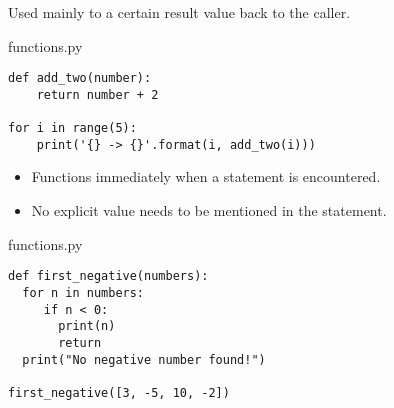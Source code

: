 \documentclass[aspectratio=1610,slidestop]{beamer}
\begin{document}
\begin{pframe}
 Used mainly to  a certain result value back to the caller.
 \medskip

 \begin{minipage}[t]{0.60\textwidth}
  \begin{pythonfile}{functions.py}
   \begin{verbatim}
def add_two(number):
    return number + 2

for i in range(5):
    print('{} -> {}'.format(i, add_two(i)))
   \end{verbatim}
  \end{pythonfile}
 \end{minipage}\qquad
 \pause
 \begin{minipage}[t]{0.35\textwidth}
 \vspace{-3.05cm}
 \begin{terminal}
 \end{terminal}
 \end{minipage}
\end{pframe}


\begin{pframe}
 \begin{itemize}
  \item Functions immediately  when a  statement is encountered.
  \item No explicit value needs to be mentioned in the  statement.
 \end{itemize}
 \pause
 \medskip

 \begin{minipage}[t]{0.49\textwidth}
  \begin{pythonfile}{functions.py}
   \begin{verbatim}
def first_negative(numbers):
  for n in numbers:
     if n < 0:
       print(n)
       return
  print("No negative number found!")

first_negative([3, -5, 10, -2])
   \end{verbatim}
  \end{pythonfile}
 \end{minipage}\qquad
 \pause
 \begin{minipage}[t]{0.45\textwidth}
 \vspace{-4.15cm}
 \begin{terminal}
 \end{terminal}
 \end{minipage}
\end{pframe}
\end{document}
